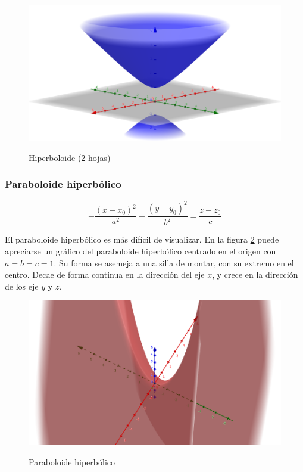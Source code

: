 \documentclass{article}
\begin{document}
\begin{figure}[ht]
\caption{Hiperboloide (2 hojas)}
\includegraphics[scale=0.5]{img/funciones/hiperboloide2.png} 
\centering
\label{fig:hiperboloide2}
\end{figure}

\subsubsection{Paraboloide hiperbólico}

\begin{equation}
-\frac{(x-x_0)^2}{a^2} + \frac{(y-y_0)^2}{b^2} = \frac{z-z_0}{c}
\end{equation}

El paraboloide hiperbólico es más difícil de visualizar. En la figura \ref{fig:paraboloide_h} puede apreciarse un gráfico del paraboloide hiperbólico centrado en el origen con $a = b = c =1$. Su forma se asemeja a una silla de montar, con su extremo en el centro. Decae de forma continua en la dirección del eje $x$, y crece en la dirección de los eje $y$ y $z$.

\begin{figure}[ht]
\caption{Paraboloide hiperbólico}
\includegraphics[scale=0.3]{img/funciones/paraboloideh.png} 
\centering
\label{fig:paraboloide_h}
\end{figure}
\end{document}
